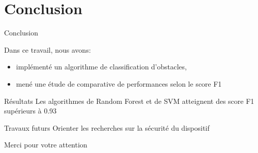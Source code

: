 \documentclass[usenames,dvipsnames]{beamer}
\begin{document}
\section{Conclusion}
\begin{frame}{Conclusion}

Dans ce travail, nous avons:
\begin{itemize}

\item implémenté un algorithme de classification d’obstacles,

\item mené une étude de comparative de performances selon le score F1

\end{itemize} 

\medskip
\begin{block}{Résultats}
Les algorithmes de Random Forest et de SVM atteignent des score F1 supérieurs à 0.93
\end{block}


\begin{block}{Travaux futurs}
Orienter les recherches sur la sécurité du dispositif
\end{block}


\end{frame}

\begin{frame}
\begin{center}

\begin{Huge}
\color{Blue}Merci pour votre attention
\end{Huge}
\end{center}

\end{frame}
\end{document}
